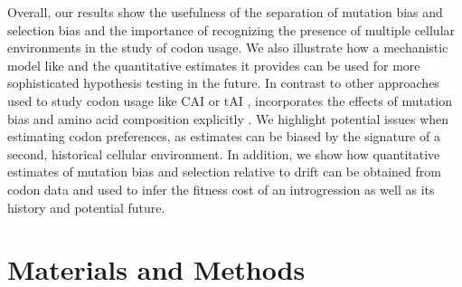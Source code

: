 \documentclass[fleqn,letterpaper]{article}
\begin{document}
Overall, our results show the usefulness of the separation of mutation bias and selection bias and the importance of recognizing the presence of multiple cellular environments in the study of codon usage.
We also illustrate how a mechanistic model like \ROC and the quantitative estimates it provides can be used for more sophisticated hypothesis testing in the future.
In contrast to other approaches used to study codon usage like CAI \citep{sharp1987} or tAI \citep{dosreis2004}, \ROC incorporates the effects of mutation bias and amino acid composition explicitly \citep{cope2018}.
We highlight potential issues when estimating codon preferences, as estimates can be biased by the signature of a second, historical cellular environment.
In addition, we show how quantitative estimates of mutation bias and selection relative to drift can be obtained from codon data and used to infer the fitness cost of an introgression as well as its history and potential future.








\section*{Materials and Methods}
\end{document}
